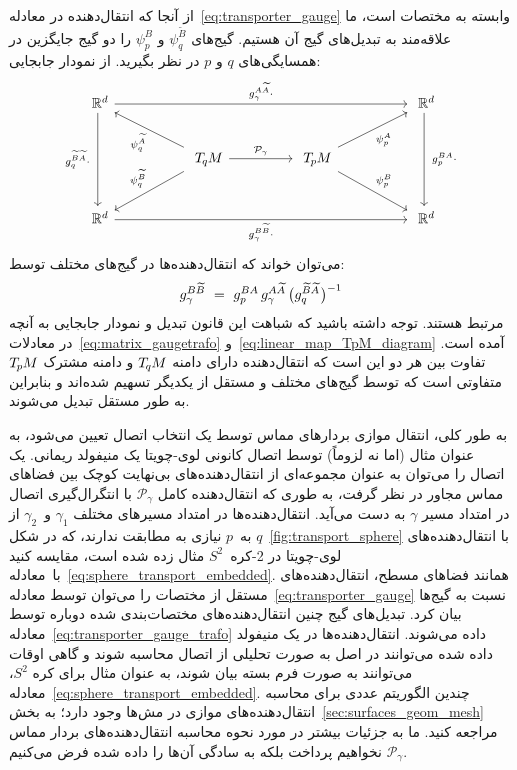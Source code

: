 از آنجا که انتقال‌دهنده در معادله~\eqref{eq:transporter_gauge} وابسته به مختصات است، ما علاقه‌مند به تبدیل‌های گیج آن هستیم.
گیج‌های $\psi_q^{\widetilde{B}}$ و $\psi_p^B$ را دو گیج جایگزین در همسایگی‌های $q$ و $p$ در نظر بگیرید.
از نمودار جابجایی:
\begin{equation}\label{cd:transporter_trivialization}
\begin{tikzcd}[column sep=50pt, row sep=25pt, font=\normalsize]
    \R^d
        \arrow[dd, "g_q^{\widetilde{B}\widetilde{A}}\cdot\ "']
        \arrow[rrr, "g_\gamma^{A\widetilde{A}}\cdot"]
    & &[-1ex] &
    \R^d
        \arrow[dd, "\ g_p^{BA}\cdot"]
    \\
    &
    \TqM
        \arrow[ul, "\psi_q^{\widetilde{A}}"]
        \arrow[dl, "\psi_q^{\widetilde{B}}"']
        \arrow[r, "\mathcal{P}_\gamma"]
    &
    \TpM
        \arrow[ur, "\psi_p^A"']
        \arrow[dr, "\psi_p^B"]
    \\
    \R^d
        \arrow[rrr, "g_\gamma^{B\widetilde{B}}\cdot"']
    & & &
    \R^d
\end{tikzcd}
\end{equation}
می‌توان خواند که انتقال‌دهنده‌ها در گیج‌های مختلف توسط:
\begin{align}\label{eq:transporter_gauge_trafo}
    g_\gamma^{B\widetilde{B}}
    \ =\ g_p^{BA}\, g_\gamma^{A\widetilde{A}}\, \big(g_q^{\widetilde{B}\widetilde{A}} \mkern1mu\big)^{-1}
\end{align}
مرتبط هستند.
توجه داشته باشید که شباهت این قانون تبدیل و نمودار جابجایی به آنچه در معادلات~\eqref{eq:matrix_gaugetrafo} و~\eqref{eq:linear_map_TpM_diagram} آمده است.
تفاوت بین هر دو این است که انتقال‌دهنده دارای دامنه $T_{\mkern-1.5mu q}\mkern-.5muM$ و دامنه مشترک $T_{\mkern-1.5mu p}\mkern-.5muM$ متفاوتی است که توسط گیج‌های مختلف و مستقل از یکدیگر تسهیم شده‌اند و بنابراین به طور مستقل تبدیل می‌شوند.


به طور کلی، انتقال موازی بردارهای مماس توسط یک انتخاب اتصال تعیین می‌شود، به عنوان مثال (اما نه لزوماً) توسط اتصال کانونی لوی-چویتا یک منیفولد ریمانی.
یک اتصال را می‌توان به عنوان مجموعه‌ای از انتقال‌دهنده‌های بی‌نهایت کوچک بین فضاهای مماس مجاور در نظر گرفت، به طوری که انتقال‌دهنده کامل $\mathcal{P}_\gamma$ با انتگرال‌گیری اتصال در امتداد مسیر $\gamma$ به دست می‌آید.
انتقال‌دهنده‌ها در امتداد مسیرهای مختلف $\gamma_1$ و~$\gamma_2$ از $q$ به~$p$ نیازی به مطابقت ندارند، که در شکل~\ref{fig:transport_sphere} با انتقال‌دهنده‌های لوی-چویتا در 2-کره~$S^2$ مثال زده شده است، مقایسه کنید با~معادله~\eqref{eq:sphere_transport_embedded}.
همانند فضاهای مسطح، انتقال‌دهنده‌های مستقل از مختصات را می‌توان توسط معادله~\eqref{eq:transporter_gauge} نسبت به گیج‌ها بیان کرد.
تبدیل‌های گیج چنین انتقال‌دهنده‌های مختصات‌بندی شده دوباره توسط معادله~\eqref{eq:transporter_gauge_trafo} داده می‌شوند.
انتقال‌دهنده‌ها در یک منیفولد داده شده می‌توانند در اصل به صورت تحلیلی از اتصال محاسبه شوند \cite{gallier2019diffgeom1,nakahara2003geometry} و گاهی اوقات می‌توانند به صورت فرم بسته بیان شوند، به عنوان مثال برای کره $S^2$، معادله~\eqref{eq:sphere_transport_embedded}.
چندین الگوریتم عددی برای محاسبه انتقال‌دهنده‌های موازی در مش‌ها وجود دارد؛ به بخش~\ref{sec:surfaces_geom_mesh} مراجعه کنید.
ما به جزئیات بیشتر در مورد نحوه محاسبه انتقال‌دهنده‌های بردار مماس $\mathcal{P}_\gamma$ نخواهیم پرداخت بلکه به سادگی آن‌ها را داده شده فرض می‌کنیم.


